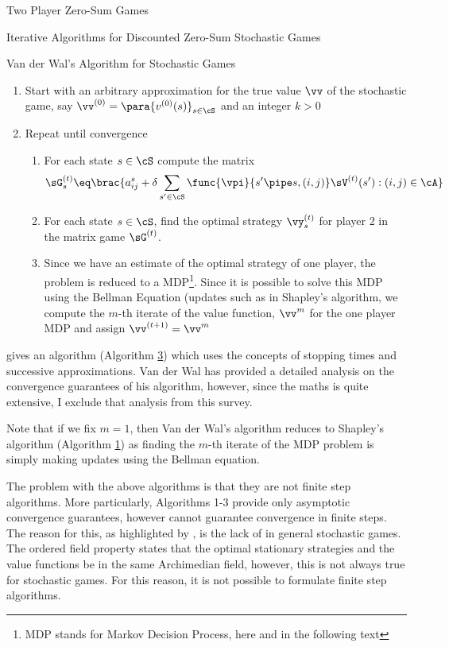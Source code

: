 \documentclass{article}
\begin{document}
\begin{psection}{Two Player Zero-Sum Games}
\begin{psubsection}{Iterative Algorithms for Discounted Zero-Sum Stochastic Games}

		\begin{algo}[0.9\textwidth]{Van der Wal's Algorithm for Stochastic Games}
			\begin{enumerate}
				\item Start with an arbitrary approximation for the true value $\vv$ of the stochastic game, say $\vv^{(0)} = \para{v^{(0)}(s)}_{s \in \cS}$ and an integer $k > 0$
				\item Repeat until convergence
					\begin{enumerate}
						\item For each state $s \in \cS$ compute the matrix
							\begin{align*}
								\sG_s^{(t)} \eq \brac{a^s_{ij} + \delta \sum_{s' \in \cS} \func{\vpi}{s' \pipe s, (i, j)} \sV^{(t)}(s') : (i, j) \in \cA}
							\end{align*}
						\item For each state $s \in \cS$, find the optimal strategy $\vy_s^{(t)}$ for player 2 in the matrix game $\sG^{(t)}$.
						\item Since we have an estimate of the optimal strategy of one player, the problem is reduced to a MDP\footnote{MDP stands for Markov Decision Process, here and in the following text}. Since it is possible to solve this MDP using the Bellman Equation (updates such as in Shapley's algorithm, we compute the $m$-th iterate of the value function, $\vv^{m}$ for the one player MDP and assign $\vv^{(t + 1)} = \vv^m$
					\end{enumerate}
			\end{enumerate}
		\end{algo}

		\cite{van-der-wal} gives an algorithm (Algorithm \hyperlink{algo:3}{3}) which uses the concepts of stopping times and successive approximations. Van der Wal has provided a detailed analysis on the convergence guarantees of his algorithm, however, since the maths is quite extensive, I exclude that analysis from this survey.

		Note that if we fix $m = 1$, then Van der Wal's algorithm reduces to Shapley's algorithm (Algorithm \hyperlink{algo:1}{1}) as finding the $m$-th iterate of the MDP problem is simply making updates using the Bellman equation.

		The problem with the above algorithms is that they are not finite step algorithms. More particularly, Algorithms 1-3 provide only asymptotic convergence guarantees, however cannot guarantee convergence in finite steps. The reason for this, as highlighted by \cite{survey}, is the lack of  in general stochastic games. The ordered field property states that the optimal stationary strategies and the value functions be in the same Archimedian field, however, this is not always true for stochastic games. For this reason, it is not possible to formulate finite step algorithms.


\end{psubsection}
\end{psection}
\end{document}
